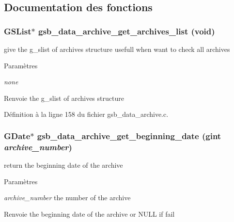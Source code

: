 \subsection{Documentation des fonctions}
\subsubsection[{gsb\_\-data\_\-archive\_\-get\_\-archives\_\-list}]{\setlength{\rightskip}{0pt plus 5cm}GSList$\ast$ gsb\_\-data\_\-archive\_\-get\_\-archives\_\-list (void)}\label{gsb__data__archive_8h_a7d5b3a8b5e99a9bbe14f526ab3d1936b}
give the g\_\-slist of archives structure usefull when want to check all archives


\begin{DoxyParams}{Paramètres}
\item[{\em none}]\end{DoxyParams}
\begin{DoxyReturn}{Renvoie}
the g\_\-slist of archives structure 
\end{DoxyReturn}


Définition à la ligne 158 du fichier gsb\_\-data\_\-archive.c.

\subsubsection[{gsb\_\-data\_\-archive\_\-get\_\-beginning\_\-date}]{\setlength{\rightskip}{0pt plus 5cm}GDate$\ast$ gsb\_\-data\_\-archive\_\-get\_\-beginning\_\-date (gint {\em archive\_\-number})}\label{gsb__data__archive_8h_afc0ef716ad2bcd7b9805571c6bcdc04d}
return the beginning date of the archive


\begin{DoxyParams}{Paramètres}
\item[{\em archive\_\-number}]the number of the archive\end{DoxyParams}
\begin{DoxyReturn}{Renvoie}
the beginning date of the archive or NULL if fail 
\end{DoxyReturn}


